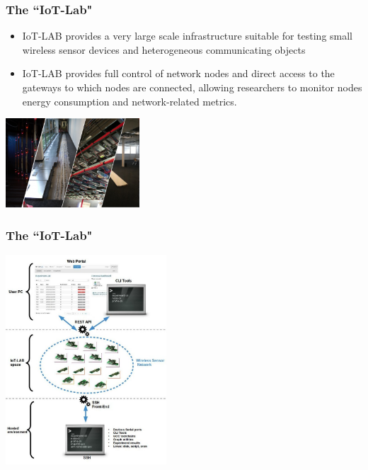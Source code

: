 \documentclass{beamer}
\begin{document}
\begin{frame}
	\frametitle{The ``IoT-Lab"}
	\begin{itemize}
		\justifying
		\item IoT-LAB provides a very large scale infrastructure suitable for testing small wireless sensor devices and heterogeneous communicating objects
		\item IoT-LAB provides full control of network nodes and direct access to the gateways to which nodes are connected, allowing researchers to monitor nodes energy consumption and network-related metrics.
	\end{itemize}
	\vspace{.5cm}
	\hspace*{5.5cm} \includegraphics[width=5cm]{figs/iot-lab-1.png}
\end{frame}

\begin{frame}
	\frametitle{The ``IoT-Lab"}
	\begin{center}
	\includegraphics[width=6cm]{figs/IoTLab-platform-overview.jpg}	
	\end{center}

\end{frame}
\end{document}
